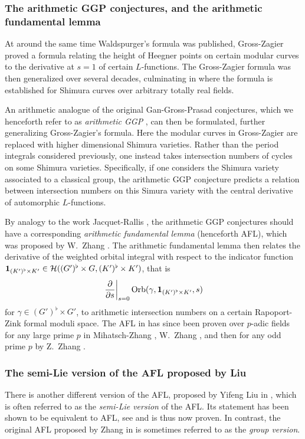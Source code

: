 \subsubsection{The arithmetic GGP conjectures, and the arithmetic fundamental lemma}
At around the same time Waldspurger's formula was published,
Gross-Zagier \cite{ref:gross_zagier} proved a formula
relating the height of Heegner points
on certain modular curves to the derivative at $s=1$ of certain $L$-functions.
The Gross-Zagier formula was then generalized over several decades,
culminating in \cite{ref:GZshimura} where the formula is established
for Shimura curves over arbitrary totally real fields.

An arithmetic analogue of the original Gan-Gross-Prasad conjectures,
which we henceforth refer to as \emph{arithmetic GGP} \cite{ref:GGP},
can then be formulated, further generalizing Gross-Zagier's formula.
Here the modular curves in Gross-Zagier
are replaced with higher dimensional Shimura varieties.
Rather than the period integrals considered previously,
one instead takes intersection numbers of cycles on some Shimura varieties.
Specifically, if one considers the Shimura variety associated to a classical group,
the arithmetic GGP conjecture predicts a relation between intersection numbers
on this Simura variety with the central derivative of automorphic $L$-functions.

By analogy to the work Jacquet-Rallis \cite{ref:JR},
the arithmetic GGP conjectures should have a corresponding
\emph{arithmetic fundamental lemma} (henceforth AFL),
which was proposed by W.\ Zhang \cite[Conjecture 2.9]{ref:AFL}.
The arithmetic fundamental lemma then relates the derivative
of the weighted orbital integral with respect to the indicator function
$\mathbf{1}_{(K')^\flat \times K'} \in \mathcal H((G')^\flat \times G, (K')^\flat \times K')$, that is
\[ \left. \pdv{}{s} \right\rvert_{s=0} \operatorname{Orb}(\gamma, \mathbf{1}_{(K')^\flat \times K'}, s) \]
for $\gamma \in (G')^\flat \times G'$,
to arithmetic intersection numbers on a certain Rapoport-Zink formal moduli space.
The AFL in \cite{ref:AFL} has since been proven over $p$-adic fields for any large
prime $p$ in Mihatsch-Zhang \cite{ref:MZ2021}, W.\ Zhang \cite{ref:Wei2021},
and then for any odd prime $p$ by Z.\ Zhang \cite{ref:Zhiyu}.

\subsubsection{The semi-Lie version of the AFL proposed by Liu}
There is another different version of the AFL, proposed by Yifeng Liu in
\cite[Conjecture 1.12]{ref:liuFJ},
which is often referred to as the \emph{semi-Lie version} of the AFL.
Its statement has been shown to be equivalent to AFL,
see \cite[Remark 1.13]{ref:liuFJ} and is thus now proven.
In contrast, the original AFL proposed by Zhang in \cite[Conjecture 2.9]{ref:AFL}
is sometimes referred to as the \emph{group version}.


